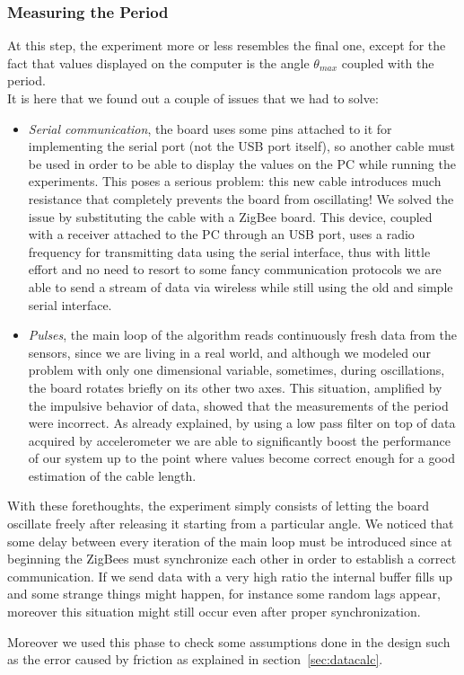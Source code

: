 \subsubsection{Measuring the Period}
At this step, the experiment more or less resembles the final one, except for the fact that values displayed on the computer is the angle $\theta_{max}$ coupled with the period. \\
It is here that we found out a couple of issues that we had to solve:
\begin{itemize}
	\item \textit{Serial communication}, the board uses some pins attached to it for implementing the serial port (not the USB port itself), so another cable must be used in order to be able to display the values on the PC while running the experiments. This poses a serious problem: this new cable introduces much resistance that completely prevents the board from oscillating! We solved the issue by substituting the cable with a ZigBee board. This device, coupled with a receiver attached to the PC through an USB port, uses a radio frequency for transmitting data using the serial interface, thus with little effort and no need to resort to some fancy communication protocols we are able to send a stream of data via wireless while still using the old and simple serial interface.
	\item \textit{Pulses}, the main loop of the algorithm reads continuously fresh data from the sensors, since we are living in a real world, and although we modeled our problem with only one dimensional variable, sometimes, during oscillations, the board rotates briefly on its other two axes. This situation, amplified by the impulsive behavior of data, showed that the measurements of the period were incorrect. As already explained, by using a low pass filter on top of data acquired by accelerometer we are able to significantly boost the performance of our system up to the point where values become correct enough for a good estimation of the cable length.
\end{itemize}
With these forethoughts, the experiment simply consists of letting the board oscillate freely after releasing it starting from a particular angle. We noticed that some delay between every iteration of the main loop must be introduced since at beginning the ZigBees must synchronize each other in order to establish a correct communication. If we send data with a very high ratio the internal buffer fills up and some strange things might happen, for instance some random lags appear, moreover this situation might still occur even after proper synchronization.\par
Moreover we used this phase to check some assumptions done in the design such as the error caused by friction as explained in section~\ref{sec:datacalc}.
